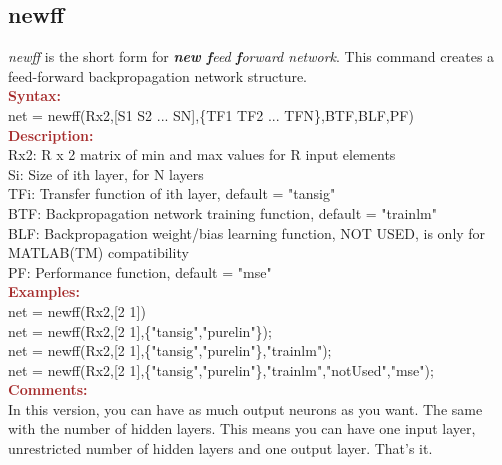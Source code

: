 \subsection{newff}
\textit{newff} is the short form for \textit{\textbf{new f}eed \textbf{f}orward network}. This command creates a feed-forward backpropagation network structure.\\

\noindent \textbf{\textcolor{brown}{Syntax:}}\\

\noindent net = newff(Rx2,[S1 S2 ... SN],\{TF1 TF2 ... TFN\},BTF,BLF,PF)\\

\noindent \textbf{\textcolor{brown}{Description:}}\\

\noindent Rx2: R x 2 matrix of min and max values for R input elements\\ 
\noindent Si: Size of ith layer, for N layers\\ 
\noindent TFi: Transfer function of ith layer, default = "tansig"\\
\noindent BTF: Backpropagation network training function, default = "trainlm" \\
\noindent BLF: Backpropagation weight/bias learning function, NOT USED, is only for MATLAB(TM) compatibility\\
\noindent PF: Performance function, default = "mse"\\

\noindent \textbf{\textcolor{brown}{Examples:}}\\

\noindent net = newff(Rx2,[2 1])\\
\noindent net = newff(Rx2,[2 1],\{"tansig","purelin"\});\\
\noindent net = newff(Rx2,[2 1],\{"tansig","purelin"\},"trainlm");\\
\noindent net = newff(Rx2,[2 1],\{"tansig","purelin"\},"trainlm","notUsed","mse");\\

\noindent \textbf{\textcolor{brown}{Comments:}}\\
In this version, you can have as much output neurons as you want. The same with the number of hidden layers. This means you can have one input layer, unrestricted number of hidden layers and one output layer. That's it.\\


